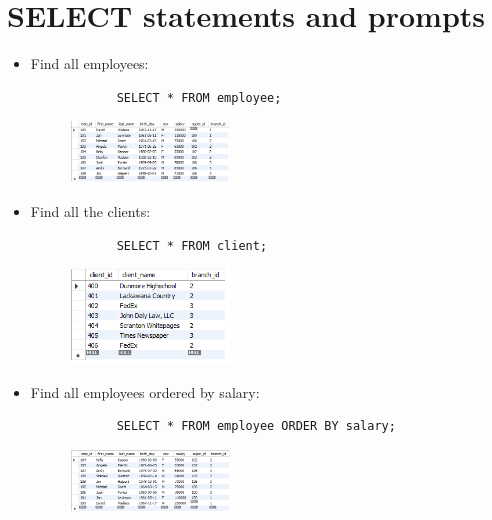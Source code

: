 \section{SELECT statements and prompts}
\begin{itemize}
    \item Find all employees:
        \begin{verbatim}
            SELECT * FROM employee;
        \end{verbatim}
        \begin{figure}[H]
            \centering
            \includegraphics[width=0.4\textwidth]{./Figs/2020-12-24-20-38-38.png}
        \end{figure}
    
    \item Find all the clients:
        \begin{verbatim}
            SELECT * FROM client;
        \end{verbatim}
        \begin{figure}[H]
            \centering
            \includegraphics[width=0.4\textwidth]{./Figs/2020-12-24-20-39-09.png}
        \end{figure}
    
    \item Find all employees ordered by salary:
        \begin{verbatim}
            SELECT * FROM employee ORDER BY salary; 
        \end{verbatim}
        \begin{figure}[H]
            \centering
            \includegraphics[width=0.4\textwidth]{./Figs/2020-12-24-20-39-36.png}
        \end{figure}
    

\end{itemize}
